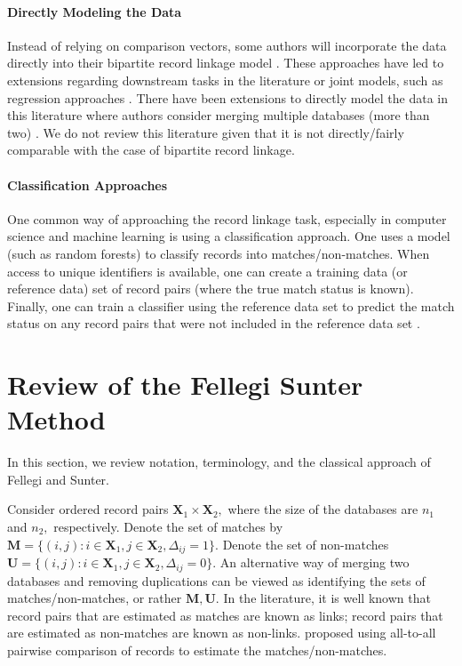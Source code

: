 \documentclass[12pt,letterpaper]{article}
\newcommand{\1}[1]{\mathbb{I}\!\left[#1\right]} %
\begin{document}

\paragraph{Directly Modeling the Data} Instead of relying on comparison vectors, some authors will incorporate the data directly into their bipartite record linkage model \citep{Fortinietal01, Matsakis10, liseo_jos_2011, liseo_2011, gutman_bayesian_2013, shan2020bayesian}. These approaches have led to extensions regarding downstream tasks in the literature or joint models, such as regression approaches \citep{dalzell2018regression, steorts2018generalized, tancredi2020unified}.  There have been extensions to directly model the data in this literature where authors consider merging multiple databases (more than two) \citep{steorts_bayesian_2016, steorts_entity_2015, zanella_flexible_2016, marchant_distributed_2019, tancredi_2015_regression}. 
We do not review this literature given that it is not directly/fairly comparable with the case of bipartite record linkage.

\paragraph{Classification Approaches} 
One common way of approaching the record linkage task, especially in computer science and machine learning is using a classification approach. One uses a model (such as random forests) to classify records into matches/non-matches. When access to unique identifiers is available, one can create a training data (or reference data) set of record pairs (where the true match status is known).  Finally, one can train a classifier using the reference data set to predict the match status on any record pairs that were not included in the reference data set \citep{Bilenko2006, Christen2008, ventura2015seeing}. 

\section{Review of the Fellegi Sunter Method}
In this section, we review notation, terminology, and the classical approach of Fellegi and Sunter. 

Consider ordered record pairs $\bm{X}_1 \times \bm{X}_2,$ where the size of the databases are $n_1$ and $n_2,$ respectively. 
Denote the set of matches by $\bm{M} = \{(i,j): i \in \bm{X}_1, j \in \bm{X}_2, \Delta_{ij} = 1\}.$ Denote the set of non-matches 
$\bm{U} =  \{(i,j): i \in \bm{X}_1, j \in \bm{X}_2, \Delta_{ij} = 0\}.$ An alternative way of merging two databases and removing 
duplications can be viewed as identifying the sets of matches/non-matches, or rather $\bm{M}, \bm{U}.$ In the literature, it is well known that record pairs that are estimated as matches are known as links; record pairs that are estimated as non-matches are known as non-links. \cite{fellegi_theory_1969} proposed using all-to-all pairwise comparison of records to estimate the matches/non-matches.
\end{document}
